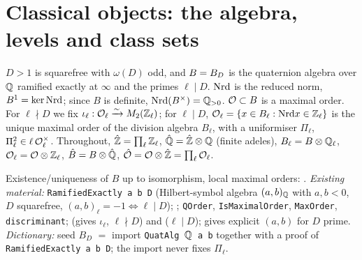 \section{Classical objects: the algebra, levels and class sets}

\begin{definition}\label{def:s01-B}
$D>1$ is squarefree with $\omega(D)$ odd, and $B=B_D$ is the quaternion algebra over $\mathbb{Q}$ ramified exactly at $\infty$
and the primes $\ell\mid D$. $\mathrm{Nrd}$ is the reduced norm, $B^1=\ker\mathrm{Nrd}$; since $B$ is definite, $\mathrm{Nrd}(B^\times)=\mathbb{Q}_{>0}$.
$\mathcal{O}\subset B$ is a maximal order. For $\ell\nmid D$ we fix $\iota_\ell:\mathcal{O}_\ell\xrightarrow{\sim}M_2(\mathbb{Z}_\ell)$; for $\ell\mid D$,
$\mathcal{O}_\ell=\{x\in B_\ell:\mathrm{Nrd} x\in\mathbb{Z}_\ell\}$ is the unique maximal order of the division algebra $B_\ell$, with a
uniformiser $\Pi_\ell$, $\Pi_\ell^2\in\ell\,\mathcal{O}_\ell^\times$.
Throughout, $\hat{\mathbb{Z}}=\prod_\ell\mathbb{Z}_\ell$, $\hat{\mathbb{Q}}=\hat{\mathbb{Z}}\otimes\mathbb{Q}$ (finite adeles), $B_\ell=B\otimes\mathbb{Q}_\ell$, $\mathcal{O}_\ell=\mathcal{O}\otimes\mathbb{Z}_\ell$, $\hat B=B\otimes\hat{\mathbb{Q}}$, $\hat{\mathcal{O}}=\mathcal{O}\otimes\hat{\mathbb{Z}}=\prod_\ell\mathcal{O}_\ell$.
\end{definition}
\noindent\stknown{} Existence/uniqueness of $B$ up to isomorphism, local maximal orders:
.
\emph{Existing material:}  \texttt{RamifiedExactly a b D} (Hilbert-symbol algebra
$(a,b)_{\mathbb{Q}}$ with $a,b<0$, $D$ squarefree, $(a,b)_\ell=-1\iff\ell\mid D$);  ;
 \texttt{QOrder}, \texttt{IsMaximalOrder}, \texttt{MaxOrder}, \texttt{discriminant};
  (gives $\iota_\ell$, $\ell\nmid D$) and
 ($\ell\mid D$);  gives explicit $(a,b)$ for $D$ prime.
\emph{Dictionary:} seed $B_D$ $=$ import \texttt{QuatAlg $\mathbb{Q}$ a b} together with a proof of \texttt{RamifiedExactly a b D};
the import never fixes $\Pi_\ell$.

